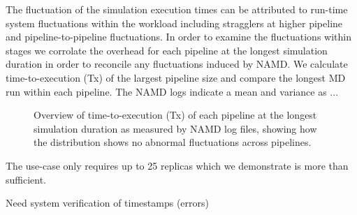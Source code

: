 The fluctuation of the simulation execution times can be attributed to run-time system fluctuations within the workload including stragglers at higher pipeline and pipeline-to-pipeline fluctuations. In order to examine the fluctuations within stages we corrolate the overhead for each pipeline at the longest simulation duration in order to reconcile any fluctuations induced by NAMD. We calculate time-to-execution (Tx) of the largest pipeline size and compare the longest MD run within each pipeline. The NAMD logs indicate a mean and variance as ...

\begin{figure}[!htbp]
  \centering
  \begin{minipage}[b]{0.55\textwidth}
  \centering
  \end{minipage}
  \begin{minipage}[b]{0.44\textwidth}
  \centering
  \end{minipage}
\caption{Overview of time-to-execution (Tx) of each pipeline at the longest simulation duration as measured by NAMD log files, showing how the distribution shows no abnormal fluctuations across pipelines.}
\label{fig:namd_logs}
\end{figure}



The use-case only requires up to 25 replicas which we demonstrate is more than sufficient. 




Need system verification of timestamps (errors) 




